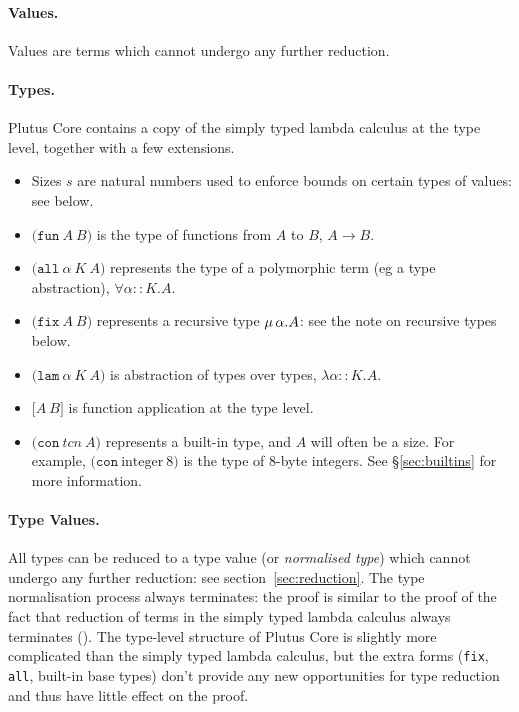\documentclass[a4paper]{article}
\newcommand{\keyword}[1]{\texttt{#1}}
\newcommand{\construct}[1]{\texttt{(} #1 \texttt{)}}
\newcommand{\funT}[2]{\construct{\keyword{fun} ~ #1 ~ #2}}
\newcommand{\fixT}[2]{\construct{\keyword{fix} ~ #1 ~ #2}}
\newcommand{\allT}[3]{\construct{\keyword{all} ~ #1 ~ #2 ~ #3}}
\newcommand{\conT}[2]{\construct{\keyword{con} ~ #1 ~ #2}}
\newcommand{\lamT}[3]{\construct{\keyword{lam} ~ #1 ~ #2 ~ #3}}
\newcommand{\appT}[2]{\texttt{[} #1 ~ #2 \texttt{]}}
\begin{document}



\paragraph{Values.} Values are terms which cannot undergo any further reduction.

\paragraph{Types.} Plutus Core contains a copy of the simply typed lambda calculus
  at the type level, together with a few extensions.
\begin{itemize}
\item Sizes $s$ are natural numbers used to enforce bounds on certain types of values: see below.
\item $\funT{A}{B}$ is the type of functions from $A$ to $B$, $A \rightarrow B$.
\item $\allT{\alpha}{K}{A}$ represents the type of a polymorphic term (eg a type abstraction), $\forall \alpha{::}K.A$.
\item $\fixT{A}{B}$ represents a recursive type $\mu\,\alpha.A$: see the note on recursive types below.
\item $\lamT{\alpha}{K}{A}$ is abstraction of types over types, $\lambda \alpha{::}K.A$.
\item $\appT{A}{B}$ is function application at the type level.
\item $\conT{tcn}{A}$ represents a built-in type, and $A$ will often be a size.  For example, $\conT{\textrm{integer}}{8}$
is the type of 8-byte integers.  See \S\ref{sec:builtins} for more information.
\end{itemize}

\paragraph{Type Values.} All types can be reduced to a type value (or
  \textit{normalised type}) which cannot undergo any further
  reduction: see section~\ref{sec:reduction}.  The type normalisation
  process always terminates: the proof is similar to the proof of the
  fact that reduction of terms in the simply typed lambda calculus
  always terminates (\cite[\S12]{Pierce:TAPL}).  The type-level
  structure of Plutus Core is slightly more complicated than the
  simply typed lambda calculus, but the extra forms (\texttt{fix},
  \texttt{all}, built-in base types) don't provide any new
  opportunities for type reduction and thus have little effect on the
  proof.
\end{document}
